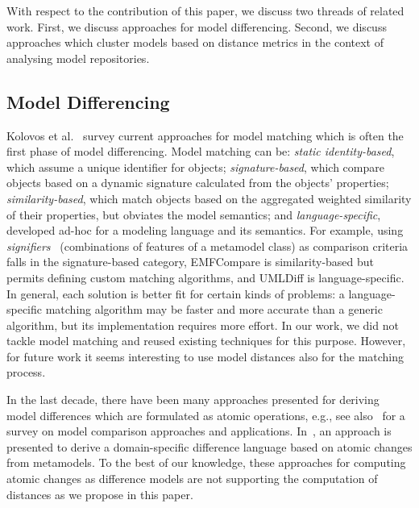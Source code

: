 With respect to the contribution of this paper, we discuss two threads of related work. First, we discuss approaches for model differencing. Second, we discuss approaches which cluster models based on distance metrics in the context of analysing model repositories.

\subsection{Model Differencing}

Kolovos et al.~\cite{Kolovos2009} survey current approaches for model matching which is often the first phase of model differencing. Model matching can be: {\em static identity-based},
which assume a unique identifier for objects; {\em signature-based}, which compare objects based on a dynamic signature calculated from the objects' properties; {\em similarity-based}, which match objects based on the aggregated weighted similarity of their properties, but obviates the model semantics; and {\em language-specific}, developed ad-hoc for a modeling language and its semantics. For example, using {\em signifiers}~\cite{LangerWGKV12} (\ie combinations of features of a metamodel class) as comparison criteria falls in the signature-based category, EMFCompare is similarity-based but permits defining custom matching algorithms, and UMLDiff is language-specific. In general, each solution is better fit for certain kinds of problems: a language-specific matching algorithm may be faster and more accurate than a generic algorithm, but its implementation requires more effort. In our work, we did not tackle model matching and reused existing techniques for this purpose. However, for future work it seems interesting to use model distances also for the matching process. 

In the last decade, there have been many approaches presented for deriving model differences which are formulated as atomic operations, e.g., see also~\cite{StephanC13} for a survey on
model comparison approaches and applications. In~\cite{}, an approach is presented to derive a domain-specific difference language based on atomic changes from metamodels. To the best of our knowledge, these approaches for computing atomic changes as difference models are not supporting the computation of distances as we propose in this paper.

